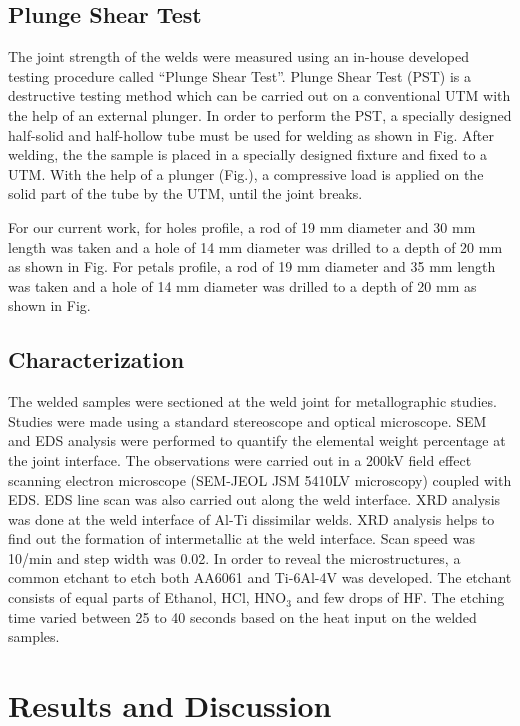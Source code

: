 \documentclass[3p]{elsarticle}
\begin{document}
\subsection{Plunge Shear Test}
\label{subsec:Plunge Shear Test}
The joint strength of the welds were measured using an in-house developed testing procedure called ``Plunge Shear Test''. Plunge Shear Test (PST) is a destructive testing method which can be carried out on a conventional UTM with the help of an external plunger. In order to perform the PST, a specially designed half-solid and half-hollow tube must be used for welding as shown in Fig. After welding, the the sample is placed in a specially designed fixture and fixed to a UTM. With the help of a plunger (Fig.), a compressive load is applied on the solid part of the tube by the UTM, until the joint breaks.
\par
For our current work, for holes profile, a rod of 19 mm diameter and 30 mm length was taken and a hole of 14 mm diameter was drilled to a depth of 20 mm as shown in Fig. For petals profile, a rod of 19 mm diameter and 35 mm length was taken and a hole of 14 mm diameter was drilled to a depth of 20 mm as shown in Fig.


\subsection{Characterization}
\label{subsec:Characterization}
The welded samples were sectioned at the weld joint for metallographic studies. Studies were made using a standard stereoscope and optical microscope. SEM and EDS analysis were performed to quantify the elemental weight percentage at the joint interface. The observations were carried out in a 200kV field effect scanning electron microscope (SEM-JEOL JSM 5410LV microscopy) coupled with EDS. EDS line scan was also carried out along the weld interface. XRD analysis was done at the weld interface of Al-Ti dissimilar welds. XRD analysis helps to find out the formation of intermetallic at the weld interface. Scan speed was 10\degree /min and step width was 0.02\degree . In order to reveal the microstructures, a common etchant to etch both AA6061 and Ti-6Al-4V was developed. The etchant consists of equal parts of Ethanol, HCl, HNO$_{3}$ and few drops of HF. The etching time varied between 25 to 40 seconds based on the heat input on the welded samples.

\section{Results and Discussion}
\label{sec:Results and Discussion}
\end{document}
